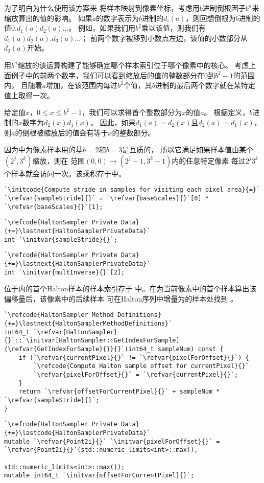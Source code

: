为了明白为什么使用该方案来
将样本映射到像素坐标，考虑用$b$进制倒根因子$b^n$来缩放算出的值的影响。
如果$a$的数字表示为$b$进制的$d_i(a)$，则回想倒根为$b$进制的值$0.d_1(a)d_2(a)\ldots$。
例如，如果我们用$b^2$乘以该值，则我们有$d_1(a)d_2(a).d_3(a)\ldots$；
前两个数字被移到小数点左边，该值的小数部分从$d_3(a)$开始。

用$b^n$缩放的该运算构建了能够确定哪个样本索引位于哪个像素中的核心。
考虑上面例子中的前两个数字，我们可以看到缩放后的值的整数部分在0到$b^2-1$的范围内，
且随着$a$增加，在该范围内每过$b^2$个值，其$b$进制的最后两个数字就在某特定值上取得一次。

给定值$x$，$0\le x\le b^2-1$，我们可以求得首个整数部分为$x$的值$a$。
根据定义，$b$进制的$x$数字为$d_2(x)d_1(x)$。
因此，如果$d_1(a)=d_2(x)$且$d_2(a)=d_1(x)$，
则$a$的倒根被缩放后的值会有等于$x$的整数部分。

因为中为像素样本用的基$b=2$和$b=3$是互质的，
所以它满足如果样本值由某个$(2^j,3^k)$缩放，则在
范围$(0,0)\rightarrow(2^j-1,3^k-1)$内的任意特定像素
每过$2^j3^k$个样本就会访问一次。该乘积存于中。
\begin{lstlisting}
`\initcode{Compute stride in samples for visiting each pixel area}{=}`
`\refvar{sampleStride}{}` = `\refvar{baseScales}{}`[0] * `\refvar{baseScales}{}`[1];
\end{lstlisting}
\begin{lstlisting}
`\refcode{HaltonSampler Private Data}{+=}\lastnext{HaltonSamplerPrivateData}`
int `\initvar{sampleStride}{}`;
\end{lstlisting}
\begin{lstlisting}
`\refcode{HaltonSampler Private Data}{+=}\lastnext{HaltonSamplerPrivateData}`
int `\initvar{multInverse}{}`[2];
\end{lstlisting}

位于内的首个Halton样本的样本索引存于
中。在为当前像素中的首个样本算出该偏移量后，该像素中的后续样本
可在Halton序列中增量为的样本处找到
。
\begin{lstlisting}
`\refcode{HaltonSampler Method Definitions}{+=}\lastnext{HaltonSamplerMethodDefinitions}`
int64_t `\refvar{HaltonSampler}{}`::`\initvar[HaltonSampler::GetIndexForSample]{\refvar{GetIndexForSample}{}}{}`(int64_t sampleNum) const {
    if (`\refvar{currentPixel}{}` != `\refvar{pixelForOffset}{}`) {
        `\refcode{Compute Halton sample offset for currentPixel}{}`
        `\refvar{pixelForOffset}{}` = `\refvar{currentPixel}{}`;
    }
    return `\refvar{offsetForCurrentPixel}{}` + sampleNum * `\refvar{sampleStride}{}`;
}
\end{lstlisting}
\begin{lstlisting}
`\refcode{HaltonSampler Private Data}{+=}\lastcode{HaltonSamplerPrivateData}`
mutable `\refvar{Point2i}{}` `\initvar{pixelForOffset}{}` = `\refvar{Point2i}{}`(std::numeric_limits<int>::max(),
                                         std::numeric_limits<int>::max());
mutable int64_t `\initvar{offsetForCurrentPixel}{}`;
\end{lstlisting}


